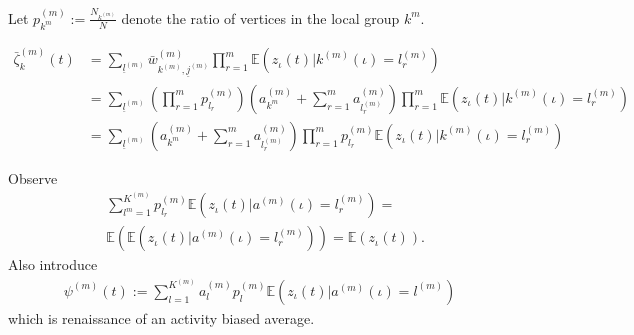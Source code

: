 \documentclass{article}
\newcommand{\E}{\mathbb{E}}
\newcommand{\1}[1]{{\mathds{1}}_{\left\{#1\right\}}}
\begin{document}
	Let $p_{k^m}^{(m)}:=\frac{N_{k^{(m)}}}{N}$ denote the ratio of vertices in the local group $k^m.$
	
	\begin{align}
		\nonumber
		\bar{\zeta}_{k}^{(m)}(t)&=\sum_{\underline{l}^{(m)}} \bar{w}_{k^{(m)},\underline{j}^{(m)}}^{(m)}\prod_{r=1}^{m}\E \left(\left. z_{\iota}(t) \right| k^{(m)}(\iota)=l_r^{(m)} \right)\\
		\nonumber
		&= \sum_{\underline{l}^{(m)}}\left( \prod_{r=1}^m p_{l_r}^{(m)}\right)\left(a_{k^m}^{(m)}+\sum_{r=1}^{m}a_{l_r^{(m)}}^{(m)} \right)\prod_{r=1}^{m}\E \left(\left. z_{\iota}(t) \right| k^{(m)}(\iota)=l_r^{(m)} \right)\\
		\label{eq:activity_calc}
		&= \sum_{\underline{l}^{(m)}}\left(a_{k^m}^{(m)}+\sum_{r=1}^{m}a_{l_r^{(m)}}^{(m)} \right)\prod_{r=1}^{m}p_{l_r}^{(m)}\E \left(\left. z_{\iota}(t) \right| k^{(m)}(\iota)=l_r^{(m)} \right)
	\end{align}
	
	Observe
	\begin{align*}
		&\sum_{l^{m}=1}^{K^{(m)}}p_{l_r}^{(m)}\E \left(\left. z_{\iota}(t) \right| a^{(m)}(\iota)=l_r^{(m)} \right)=\\
		&\E \left(\E \left(\left. z_{\iota}(t) \right| a^{(m)}(\iota)=l_r^{(m)} \right) \right)=\E \left( z_{\iota}(t)  \right).
	\end{align*}
	Also introduce
	\begin{align*}
		\psi^{(m)}(t):= \sum_{l=1}^{K^{(m)}}a_{l}^{(m)}p_{l}^{(m)}\E \left(\left. z_{\iota}(t) \right| a^{(m)}(\iota)=l^{(m)} \right)
	\end{align*}
	which is renaissance of an activity biased average.
	
\end{document}
